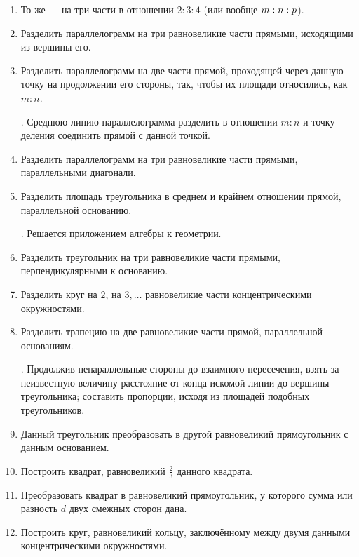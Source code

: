 {\begin{enumerate}
\item
То же — на три части в отношении $2:3:4$ (или вообще $m:n\z:p$).

\item
Разделить параллелограмм на три равновеликие части прямыми, исходящими из вершины его.

\item
Разделить параллелограмм на две части прямой, проходящей через данную точку на продолжении его стороны, так, чтобы их площади относились, как $m:n$. %

\smallskip
{}.
Среднюю линию параллелограмма разделить в отношении $m:n$ и точку деления соединить прямой с данной точкой.  

\item
Разделить параллелограмм на три равновеликие части прямыми, параллельными диагонали.

\item
Разделить площадь треугольника в среднем и крайнем отношении прямой, параллельной основанию.

\smallskip
{}.
Решается приложением алгебры к геометрии.

\item
Разделить треугольник на три равновеликие части прямыми, перпендикулярными к основанию.

\item
Разделить круг на $2$, на $3,\dots$ равновеликие части концентрическими окружностями.

\item
Разделить трапецию на две равновеликие части прямой, параллельной основаниям.

\smallskip
{}.
Продолжив непараллельные стороны до взаимного пересечения, взять за неизвестную величину расстояние от конца искомой линии до вершины треугольника;
составить пропорции, исходя из площадей подобных треугольников.

\item
Данный треугольник преобразовать в другой равновеликий прямоугольник с данным основанием.

\item
Построить квадрат, равновеликий $\tfrac23$ данного квадрата.

\item
Преобразовать квадрат в равновеликий прямоугольник, у которого сумма или разность $d$ двух смежных сторон дана.

\item
Построить круг, равновеликий кольцу, заключённому между двумя данными концентрическими окружностями.


\end{enumerate}}
